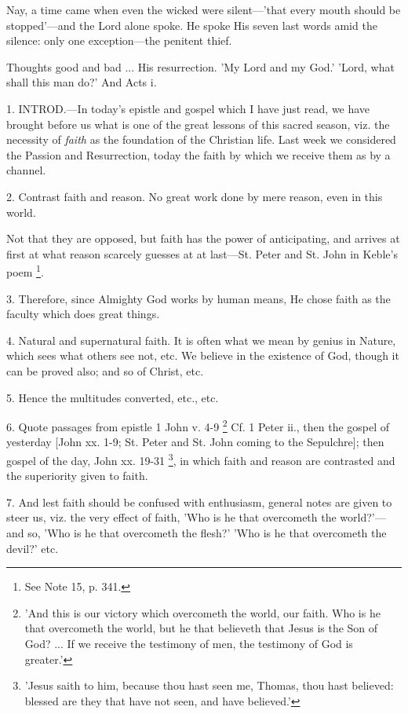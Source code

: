 Nay, a time came when even the wicked were
silent—'that every mouth should be stopped'—and the Lord alone
spoke. He spoke His seven last words amid the silence: only one
exception—the penitent thief.

Thoughts good and bad ... His resurrection. 'My
Lord and my God.' 'Lord, what shall this man do?' And Acts i.


1. INTROD.—In
today's epistle and gospel which I have just read, we have brought
before us what is one of the great lessons of this sacred season, viz.
the necessity of \emph{faith} as the foundation of the Christian life.
Last week we considered the Passion and Resurrection, today the faith
by which we receive them as by a channel.

2. Contrast faith and reason. No great work done
by mere reason, even in this world.

Not that they are opposed, but faith has the
power of anticipating, and arrives at first at what reason scarcely
guesses at at last—St. Peter and St. John in Keble's poem \footnote{See Note
15, p. 341.}.

3. Therefore, since Almighty God works by human
means, He chose faith as the faculty which does great things.

4. Natural and supernatural faith. It is often
what we mean by genius in Nature, which sees what others see not, etc.
We believe in the existence of God, though it can be proved also; and
so of Christ, etc.

5. Hence the multitudes converted, etc., etc.

6. Quote passages from epistle 1 John v. 4-9 \footnote{'And this is our victory
which overcometh the world, our faith. Who is he that overcometh the
world, but he that believeth that Jesus is the Son of God? ... If we
receive the testimony of men, the testimony of God is greater.'} Cf. 1 Peter ii., then the gospel of yesterday [John xx. 1-9;
St. Peter and St. John coming to the Sepulchre]; then gospel of
the day, John xx. 19-31 \footnote{'Jesus saith to him,
because thou hast seen me, Thomas, thou hast believed: blessed are
they that have not seen, and have believed.'},
in which faith and reason are contrasted and the superiority given to
faith.

7. And lest faith should be confused with
enthusiasm, general notes are given to steer us, viz. the very effect
of faith, 'Who is he that overcometh the world?'—and so, 'Who is he
that overcometh the flesh?' 'Who is he that overcometh the devil?'
etc.

